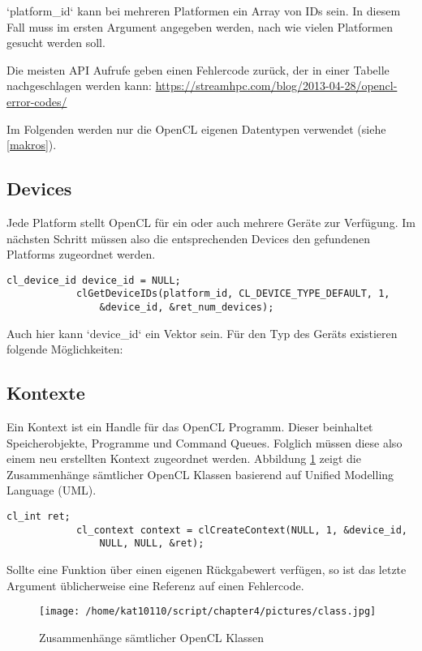 			\li`platform_id` kann bei mehreren Platformen ein Array von IDs sein. In diesem Fall muss im ersten Argument angegeben werden, nach wie vielen Platformen gesucht werden soll.
			
			Die meisten \Gls{API} Aufrufe geben einen Fehlercode zurück, der in einer Tabelle nachgeschlagen werden kann: \url{https://streamhpc.com/blog/2013-04-28/opencl-error-codes/}
			
			Im Folgenden werden nur die OpenCL eigenen Datentypen verwendet (siehe \ref{makros}).					
			\subsection{Devices}
			Jede \Gls{Platform} stellt OpenCL für ein oder auch mehrere Geräte zur Verfügung. Im nächsten Schritt müssen also die entsprechenden Devices den gefundenen \Glspl{Platform} zugeordnet werden.		
			\begin{lstlisting}[caption=~Deviceabfrage]
			cl_device_id device_id = NULL;	
			clGetDeviceIDs(platform_id, CL_DEVICE_TYPE_DEFAULT, 1, 
				&device_id, &ret_num_devices);
			\end{lstlisting}
			Auch hier kann \li`device_id` ein Vektor sein. Für den Typ des Geräts existieren folgende Möglichkeiten:
				
			\subsection{Kontexte}
			Ein \Gls{Kontext} ist ein \Gls{Handle} für das OpenCL Programm. Dieser beinhaltet Speicherobjekte, Programme und Command Queues. Folglich müssen diese also einem neu erstellten \Gls{Kontext} zugeordnet werden. Abbildung \ref{4:class} zeigt die Zusammenhänge sämtlicher OpenCL Klassen \autocite{oclRC} basierend auf Unified Modelling Language (UML). \autocite{uml}
			\begin{lstlisting}[caption=~Kontexte]
			cl_int ret;
			cl_context context = clCreateContext(NULL, 1, &device_id, 
				NULL, NULL, &ret);	
			\end{lstlisting}
			Sollte eine Funktion über einen eigenen Rückgabewert verfügen, so ist das letzte Argument üblicherweise eine Referenz auf einen Fehlercode.
			\begin{figure}[h]
				\centering
				\texttt{[image: /home/kat10110/script/chapter4/pictures/class.jpg]}
				\caption{Zusammenhänge sämtlicher OpenCL Klassen}
				\label{4:class}
			\end{figure}				
				
